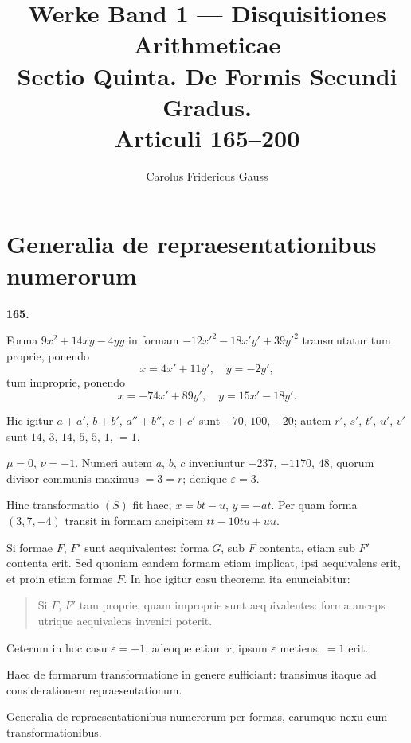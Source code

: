 \documentclass[12pt,a4paper]{article}
\title{Werke Band 1 --- Disquisitiones Arithmeticae\\[0.5em]
\large Sectio Quinta. De Formis Secundi Gradus.\\
Articuli 165--200}
\author{Carolus Fridericus Gauss}
\date{}
\theoremstyle{plain}
\begin{document}
\maketitle


\section*{Generalia de repraesentationibus numerorum}

\textbf{165.}

Forma $9x^2 + 14xy - 4yy$ in formam $-12x'^2 - 18x'y' + 39y'^2$
transmutatur tum proprie, ponendo
\[
x = 4x' + 11y', \quad y = -2y',
\]
tum improprie, ponendo
\[
x = -74x' + 89y', \quad y = 15x' - 18y'.
\]

Hic igitur $a + a'$, $b + b'$, $a'' + b''$, $c + c'$ sunt $-70$, $100$, $-20$; autem $r'$, $s'$, $t'$, $u'$, $v'$ sunt $14$, $3$, $14$, $5$, $5$, $1$, $=1$.

$\mu = 0$, $\nu = -1$. Numeri autem $a$, $b$, $c$ inveniuntur $-237$, $-1170$, $48$, quorum divisor communis maximus $= 3 = r$; denique $\varepsilon = 3$.

Hinc transformatio $(S)$ fit haec, $x = bt - u$, $y = -at$. Per quam forma $(3,7,-4)$ transit in formam ancipitem $tt - 10tu + uu$.

\medskip

Si formae $F$, $F'$ sunt aequivalentes: forma $G$, sub $F$ contenta, etiam sub $F'$ contenta erit. Sed quoniam eandem formam etiam implicat, ipsi aequivalens erit, et proin etiam formae $F$. In hoc igitur casu theorema ita enunciabitur:

\begin{quote}
Si $F$, $F'$ tam proprie, quam improprie sunt aequivalentes: forma anceps utrique aequivalens inveniri poterit.
\end{quote}

Ceterum in hoc casu $\varepsilon = +1$, adeoque etiam $r$, ipsum $\varepsilon$ metiens, $=1$ erit.

\medskip

Haec de formarum transformatione in genere sufficiant: transimus itaque ad considerationem repraesentationum.

\bigskip

\begin{center}
\Large Generalia de repraesentationibus numerorum per formas, earumque nexu cum transformationibus.
\end{center}
\end{document}

